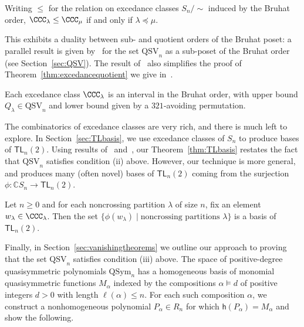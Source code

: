 \documentclass[submission]{FPSAC2024}
\theoremstyle{definition}
\theoremstyle{remark}
\numberwithin{equation}{section}
\newenvironment{introthm}[1]{
  \renewcommand\theequation{#1}
  \thm
}{\endthm}
\newenvironment{introcor}[1]{
  \renewcommand\theequation{#1}
  \cor
}{\endcor}
\newcommand{\CC}{\mathbb{C}}
\newcommand{\TL}{\mathsf{TL}}
\newcommand{\QSym}{\mathrm{QSym}}
\newcommand{\QSV}{\mathrm{QSV}}
\begin{document}
\begin{introthm}{\ref{thm:excedancequotient}}
Writing $\le$ for the relation on excedance classes $S_{n}\big/\!\! \sim$ induced by the Bruhat order, $\CCC_{\lambda} \le \CCC_{\mu}$ if and only if $\lambda \preceq \mu$.
\end{introthm}

This exhibits a duality between sub- and quotient orders of the Bruhat poset: 
a parallel result is given by~\cite{GW16} for the set $\QSV_{n}$ as a sub-poset of the Bruhat order (see Section~\ref{sec:QSV}).  The result of~\cite{GW16} also simplifies the proof of Theorem~\ref{thm:excedancequotient} we give in~\cite{BG}.  

\begin{introcor}{\ref{cor:interval}}
Each excedance class $\CCC_{\lambda}$ is an interval in the Bruhat order, with upper bound $Q_{\lambda}\in \QSV_n$ and lower bound given by a $321$-avoiding permutation.
\end{introcor}

The combinatorics of excedance classes are very rich, and there is much left to explore.   
In Section~\ref{sec:TLbasis}, we use excedance classes of $S_{n}$ to produce bases of $\TL_{n}(2)$.  Using results of~\cite{GW16} and~\cite{Z02}, our Theorem~\ref{thm:TLbasis} restates the fact that $\QSV_{n}$ satisfies condition (ii) above.  However, our technique is more general, and produces many (often novel) bases of $\TL_{n}(2)$ coming from the surjection $\phi: \CC S_{n} \to \TL_{n}(2)$.

\begin{introthm}{\ref{thm:TLbases}}
Let $n \ge 0$ and for each noncrossing partition $\lambda$ of size $n$, fix an element $w_{\lambda} \in \CCC_{\lambda}$. Then the set $\{\phi(w_{\lambda}) \;|\; \text{noncrossing partitions $\lambda$}\}$ is a basis of $\TL_{n}(2)$.
\end{introthm}

Finally, in Section~\ref{sec:vanishingtheorems} we outline our approach to proving that the set $\QSV_{n}$ satisfies condition (iii) above.  
The space of positive-degree quasisymmetric polynomials $\QSym_{n}$ has a homogeneous basis of monomial quasisymmetric functions $M_{\alpha}$ indexed by the compositions $\alpha \vDash d$ of positive integers $d > 0$ with length $\ell(\alpha) \le n$.  
For each such composition $\alpha$, we construct a nonhomogeneous polynomial $P_{\alpha} \in R_{n}$ for which $\mathsf{h}(P_{\alpha}) = M_{\alpha}$ and show the following.
\end{document}
